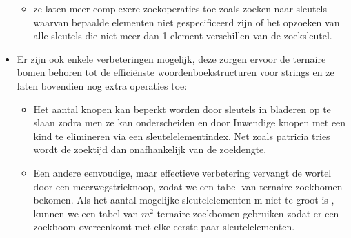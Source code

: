\begin{itemize}
\begin{itemize}
\item ze laten meer complexere zoekoperaties toe zoals zoeken naar sleutels waarvan bepaalde elementen niet gespecificeerd zijn of het opzoeken van alle sleutels die niet meer dan 1 element verschillen van de zoeksleutel.
\end{itemize}
\clearpage
\item Er zijn ook enkele verbeteringen mogelijk, deze zorgen ervoor de ternaire bomen behoren tot de effici\"enste woordenboekstructuren voor strings en ze laten bovendien nog extra operaties toe:
\begin{itemize}
\item Het aantal knopen kan beperkt worden door sleutels in bladeren op te slaan zodra men ze kan onderscheiden en door Inwendige knopen met een kind te elimineren via een sleutelelementindex. Net zoals patricia tries wordt de zoektijd dan onafhankelijk van de zoeklengte.
\item Een andere eenvoudige, maar effectieve verbetering vervangt de wortel door een meerwegstrieknoop, zodat we een tabel van ternaire zoekbomen bekomen. Als het aantal mogelijke sleutelelementen m niet te groot is , kunnen we een tabel van $m^{2}$ ternaire zoekbomen gebruiken zodat er een zoekboom overeenkomt met elke eerste paar sleutelelementen.
\end{itemize}
\end{itemize}